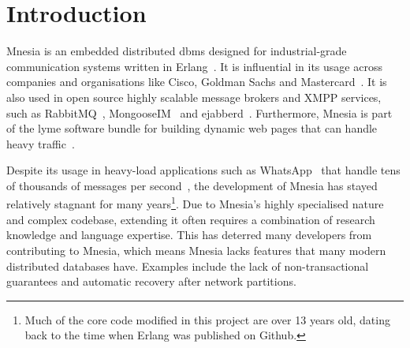 \section{Introduction} \label{sec:intro}





Mnesia is an embedded distributed \acrfull{dbms} designed for industrial-grade
communication systems written in Erlang~\cite{ericssonab2023mnesiaguide}. It is
influential in its usage across companies and organisations like Cisco,
Goldman Sachs and Mastercard~\cite{cesarini2019erlang}.
It is also used in open source highly scalable message brokers and XMPP services, such as 
RabbitMQ~\cite{vmware2023rabbitmq}, MongooseIM~\cite{erlangsolutions2023MongooseIM} and 
ejabberd~\cite{processone2023ejabberd}. Furthermore, Mnesia is part of the \acrfull{lyme}
software bundle for building dynamic web pages that can handle heavy 
traffic~\cite{wikipediacontributors2020LYME}.

Despite its usage in heavy-load applications such as WhatsApp~\cite{vorontsov2018forgETS}
that handle tens of thousands of messages per second~\cite{levy2022RabbitMQvsKafka}, the development of Mnesia has stayed
relatively stagnant for many years\footnote{Much of the core code modified in this 
project are over 13 years old, dating back to the time when Erlang was published on Github.}.
Due to Mnesia's highly specialised nature and complex codebase, extending it often requires
a combination of research knowledge and language expertise. This has
deterred many developers from contributing to Mnesia,
which means Mnesia lacks features that many modern distributed databases have. 
Examples include the lack of non-transactional
guarantees and automatic recovery after network partitions.

